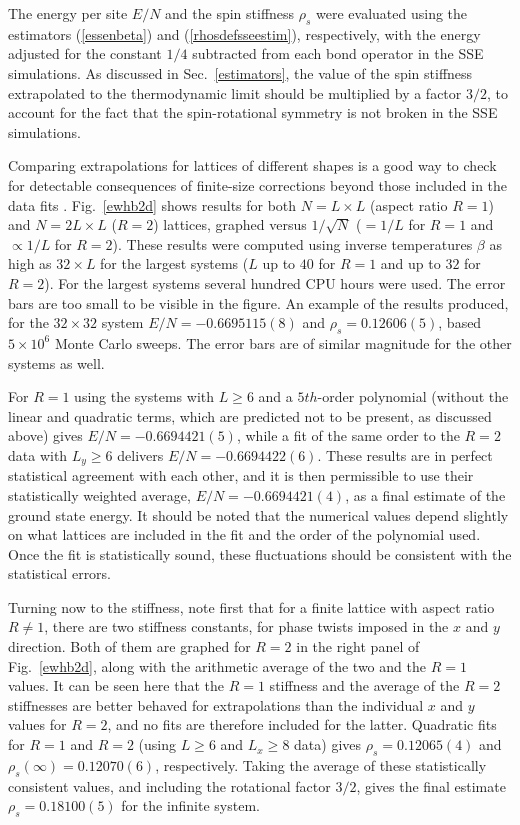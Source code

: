 \documentclass[draft,numberedheadings]{aipproc}
\begin{document}
The energy per site $E/N$ and the spin stiffness $\rho_s$ were evaluated using the estimators (\ref{essenbeta}) and (\ref{rhosdefsseestim}), respectively, with
the energy adjusted for the constant $1/4$ subtracted from each bond operator in the SSE simulations. As discussed in Sec.~\ref{estimators}, the value of the spin 
stiffness extrapolated to the thermodynamic limit should be multiplied by a factor $3/2$, to account for the fact that the spin-rotational symmetry is not 
broken in the SSE simulations.

Comparing extrapolations for lattices of different shapes is a good way to check for detectable consequences of finite-size corrections beyond those included
in the data fits \cite{mchains,chernyshev}. Fig.~\ref{ewhb2d} shows results for both $N=L\times L$ (aspect ratio $R=1$) and $N=2L\times L$ ($R=2$) lattices, graphed
versus $1/\sqrt{N}$ ($=1/L$ for $R=1$ and $\propto 1/L$ for $R=2$). These results were computed using inverse temperatures $\beta$ as high as $32\times L$ for 
the largest systems ($L$ up to $40$ for $R=1$ and up to $32$ for $R=2$). For the largest systems several hundred CPU hours were used. The error bars are too 
small to be visible in the figure. An example of the results produced, for the $32\times 32$ system $E/N=-0.6695115(8)$ and $\rho_s=0.12606(5)$, based
$5\times 10^6$ Monte Carlo sweeps. The error bars are of similar magnitude for the other systems as well.

For $R=1$ using the systems with $L\ge 6$ and a $5th$-order polynomial (without the linear and quadratic terms, which are predicted not to be present, as
discussed above) gives $E/N=-0.6694421(5)$, while a fit of the same order to the $R=2$ data with $L_y\ge 6$ delivers $E/N=-0.6694422(6)$. These results are in 
perfect statistical agreement with each other, and it is then permissible to use their statistically weighted average, $E/N=-0.6694421(4)$, as a final estimate of the
ground state energy. It should be noted that the numerical values depend slightly on what lattices are included in the fit and the order of the 
polynomial used. Once the fit is statistically sound, these fluctuations should be consistent with the statistical errors.

Turning now to the stiffness, note first that for a finite lattice with  aspect ratio $R\not=1$, there are two stiffness constants, for phase twists imposed
in the $x$  and $y$ direction. Both of them are graphed for $R=2$ in the right panel of Fig.~\ref{ewhb2d}, along with the arithmetic average of the two and
the $R=1$ values. It can be seen here that the $R=1$ stiffness and the average of the $R=2$ stiffnesses are better behaved for extrapolations than the individual 
$x$ and $y$ values for $R=2$, and no fits are therefore included for the latter. Quadratic fits for $R=1$ and $R=2$ (using $L\ge 6$ and $L_x \ge 8$ data) gives 
$\rho_s=0.12065(4)$ and $\rho_s(\infty)=0.12070(6)$, respectively. Taking the average of these statistically consistent values, and including the
rotational factor $3/2$, gives the final estimate $\rho_s=0.18100(5)$ for the infinite system.
\end{document}
